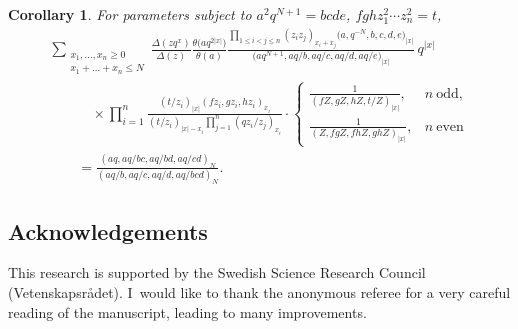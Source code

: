 \documentclass[pdftex]{sigma}
\numberwithin{equation}{section}
\newtheorem{Corollary}[Theorem]{Corollary}
\begin{document}
\begin{Corollary}
For parameters subject to $a^2q^{N+1}=bcde$, $fghz_1^2\dotsm z_n^2=t$,
\begin{gather*}
\sum_{\substack{x_1,\dots,x_n\geq 0\\x_1+\dots+x_n\leq N}}\frac{\Delta(zq^x)}{\Delta(z)}
\frac{\theta\big(aq^{2|x|}\big)}{\theta(a)}{}
\frac{\prod\limits_{1\leq i<j\leq n}(z_iz_j)_{x_i+x_j}\big(a,q^{-N},b,c,d,e\big)_{|x|}}{\big(aq^{N+1},aq/b,aq/c,aq/d,aq/e\big)_{|x|}}\,q^{|x|}\\
\qquad\quad{} \times\prod\limits_{i=1}^n\frac{(t/z_i)_{|x|}(fz_i,gz_i,hz_i)_{x_i}}{(t/z_i)_{|x|-x_i}\prod\limits_{j=1}^n(qz_i/z_j)_{x_i}}\cdot
\begin{cases}
\displaystyle\frac{1}{(fZ,gZ,hZ,t/Z)_{|x|}}, & n~\text{odd},\\[4mm]
\displaystyle\frac{1}{(Z,fgZ,fhZ,ghZ)_{|x|}}, & n~\text{even}
\end{cases}\\
\qquad{} =\frac{(aq,aq/bc,aq/bd,aq/cd)_N}{(aq/b,aq/c,aq/d,aq/bcd)_N}.
\end{gather*}
\end{Corollary}

\subsection*{Acknowledgements}
This research is supported by the Swedish Science Research Council (Vetenskapsr{\aa}det). I~would like to thank the anonymous referee for a very careful reading of the manuscript, leading to many improvements.
\end{document}
